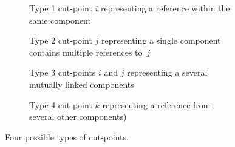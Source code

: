 \begin{figure}[t]
  \begin{subfigure}[b]{0.45\linewidth}
  \begin{center}
    
  \end{center}
  \caption{Type 1 cut-point $i$ representing a reference within the same component}
  \label{fig:t1cutpoint}
  \end{subfigure}
  \hfill
  \begin{subfigure}[b]{0.45\linewidth}
  \begin{center}
    
  \end{center}
  \caption{Type 2 cut-point $j$ representing a single component contains
    multiple references to~$j$}
  \label{fig:t2cutpoint}
  \end{subfigure}

  \noindent
  \begin{subfigure}[b]{0.45\linewidth}
  \begin{center}
    
  \end{center}
  \caption{Type 3 cut-points $i$ and $j$ representing a several mutually linked components}
  \label{fig:t3cutpoint}
  \end{subfigure}
  \hfill
  \begin{subfigure}[b]{0.45\linewidth}
  \begin{center}
    
  \end{center}
  \caption{Type 4 cut-point $k$ representing a reference from several other components)}
  \label{fig:t4cutpoint}
  \end{subfigure}

  \caption{Four possible types of cut-points.}

  \label{fig:cptypes}

\end{figure}

